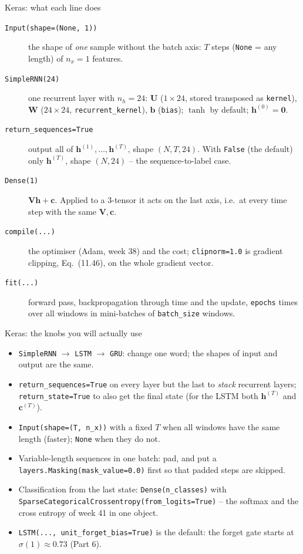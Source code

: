 \documentclass[10pt,aspectratio=169]{beamer}
\begin{document}
\begin{frame}{Keras: what each line does}
\small
\begin{description}
  \item[\texttt{Input(shape=(None, 1))}] the shape of \emph{one} sample
        without the batch axis: $T$ steps (\texttt{None} = any length) of
        $n_x=1$ features.
  \item[\texttt{SimpleRNN(24)}] one recurrent layer with $n_h=24$: $\bm{U}$
        ($1\times24$, stored transposed as \texttt{kernel}), $\bm{W}$
        ($24\times24$, \texttt{recurrent\_kernel}), $\bm{b}$ (\texttt{bias});
        $\tanh$ by default; $\bm{h}^{(0)}=\bm{0}$.
  \item[\texttt{return\_sequences=True}] output all of $\bm{h}^{(1)},\dots,\bm{h}^{(T)}$,
        shape $(N,T,24)$.  With \texttt{False} (the default) only
        $\bm{h}^{(T)}$, shape $(N,24)$ -- the sequence-to-label case.
  \item[\texttt{Dense(1)}] $\bm{V}\bm{h}+\bm{c}$.  Applied to a 3-tensor it
        acts on the last axis, i.e.\ at every time step with the same
        $\bm{V},\bm{c}$.
  \item[\texttt{compile(...)}] the optimiser (Adam, week 38) and the cost;
        \texttt{clipnorm=1.0} is gradient clipping, Eq.~(11.46), on the whole
        gradient vector.
  \item[\texttt{fit(...)}] forward pass, backpropagation through time and the
        update, \texttt{epochs} times over all windows in mini-batches of
        \texttt{batch\_size} windows.
\end{description}
\end{frame}

\begin{frame}{Keras: the knobs you will actually use}
\small
\begin{itemize}
  \item \texttt{SimpleRNN} $\to$ \texttt{LSTM} $\to$ \texttt{GRU}: change
        one word; the shapes of input and output are the same.
  \item \texttt{return\_sequences=True} on every layer but the last to
        \emph{stack} recurrent layers; \texttt{return\_state=True} to also
        get the final state (for the LSTM both $\bm{h}^{(T)}$ and
        $\bm{c}^{(T)}$).
  \item \texttt{Input(shape=(T, n\_x))} with a fixed $T$ when all windows
        have the same length (faster); \texttt{None} when they do not.
  \item Variable-length sequences in one batch: pad, and put a
        \texttt{layers.Masking(mask\_value=0.0)} first so that padded steps
        are skipped.
  \item Classification from the last state: \texttt{Dense(n\_classes)}
        with \texttt{SparseCategoricalCrossentropy(from\_logits=True)} --
        the softmax and the cross entropy of week 41 in one object.
  \item \texttt{LSTM(..., unit\_forget\_bias=True)} is the default: the
        forget gate starts at $\sigma(1)\approx0.73$ (Part 6).
\end{itemize}
\end{frame}
\end{document}
